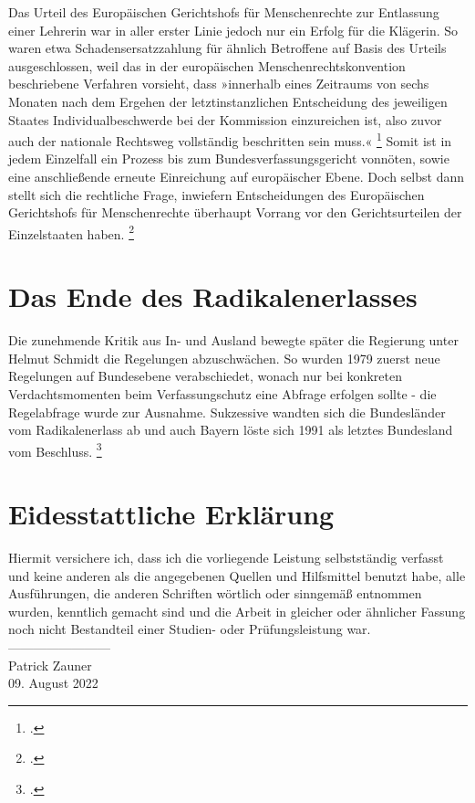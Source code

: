 \documentclass[12pt]{scrartcl}
\begin{document}
Das Urteil des Europäischen Gerichtshofs für Menschenrechte zur Entlassung einer Lehrerin war in aller erster Linie jedoch nur ein Erfolg für die Klägerin. So waren etwa Schadensersatzzahlung für ähnlich Betroffene auf Basis des Urteils ausgeschlossen, weil das in der europäischen Menschenrechtskonvention beschriebene Verfahren vorsieht, dass »innerhalb eines Zeitraums von sechs Monaten nach dem Ergehen der letztinstanzlichen Entscheidung des jeweiligen Staates Individualbeschwerde bei der Kommission einzureichen ist, also zuvor auch der nationale Rechtsweg vollständig beschritten sein muss.« \footcite[][S. 276]{edgar_wolfrum_verfassungsfeinde_2022} Somit ist in jedem Einzelfall ein Prozess bis zum Bundesverfassungsgericht vonnöten, sowie eine anschließende erneute Einreichung auf europäischer Ebene. Doch selbst dann stellt sich die rechtliche Frage, inwiefern Entscheidungen des Europäischen Gerichtshofs für Menschenrechte überhaupt Vorrang vor den Gerichtsurteilen der Einzelstaaten haben. \footcite[][S. 277]{edgar_wolfrum_verfassungsfeinde_2022}

\section{Das Ende des Radikalenerlasses}
Die zunehmende Kritik aus In- und Ausland bewegte später die Regierung unter Helmut Schmidt die Regelungen abzuschwächen. So wurden 1979 zuerst neue Regelungen auf Bundesebene verabschiedet, wonach nur bei konkreten Verdachtsmomenten beim Verfassungschutz eine Abfrage erfolgen sollte - die Regelabfrage wurde zur Ausnahme. Sukzessive wandten sich die Bundesländer vom Radikalenerlass ab und auch Bayern löste sich 1991 als letztes Bundesland vom Beschluss. \footcite[][]{bildung_vor_nodate}

\newpage

\printbibliography

\newpage
\section*{Eidesstattliche Erklärung}

Hiermit versichere ich, dass ich die vorliegende Leistung selbstständig verfasst und keine anderen als die angegebenen Quellen und Hilfsmittel benutzt habe, alle Ausführungen, die anderen Schriften wörtlich oder sinngemäß entnommen wurden, kenntlich gemacht sind und die Arbeit in gleicher oder ähnlicher Fassung noch nicht Bestandteil einer Studien- oder Prüfungsleistung war.
\\[3em]
------------------------\\
Patrick Zauner\\
09. August 2022
\end{document}
